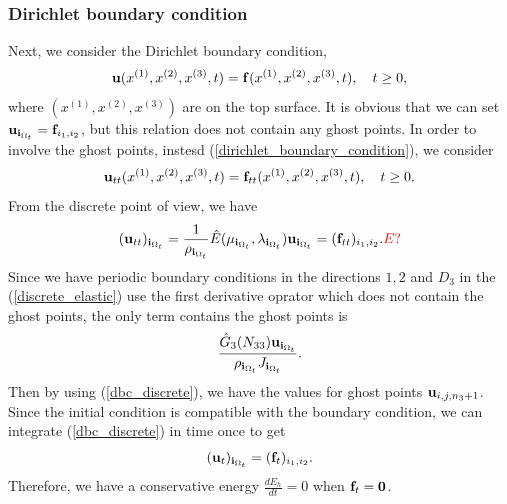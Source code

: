 \documentclass[a4paper]{article}
\begin{document}
\subsubsection{Dirichlet boundary condition}
Next, we consider the Dirichlet boundary condition, 
\begin{equation}\label{dirichlet_boundary_condition}
{\bf u}(x^{(1)},x^{(2)},x^{(3)},t) = {\bf f}(x^{(1)},x^{(2)},x^{(3)},t),  \ \ \ t \geq 0,
\end{equation}
where $(x^{(1)},x^{(2)},x^{(3)})$ are on the top surface. It is obvious that we can set ${\bf u}_{{\bf i}_{\Omega_t}} = {\bf f}_{i_1,i_2}$, but this relation does not contain any ghost points. In order to involve the ghost points, instesd (\ref{dirichlet_boundary_condition}), we consider
\begin{equation}
{\bf u}_{tt}(x^{(1)},x^{(2)},x^{(3)},t) = {\bf f}_{tt}(x^{(1)},x^{(2)},x^{(3)},t),  \ \ \ t \geq 0.
\end{equation}
From the discrete point of view, we have
\begin{equation}\label{dbc_discrete}
({\bf u}_{tt})_{{\bf i}_{\Omega_t}}=\frac{1}{\rho_{{\bf i}_{\Omega_t}}} \hat{E}(\mu_{{\bf i}_{\Omega_t}},\lambda_{{\bf i}_{\Omega_t}}){\bf u}_{{\bf i}_{\Omega_t}} = ({\bf f}_{tt})_{i_1,i_2}. {\color{red}E?}
\end{equation}
Since we have periodic boundary conditions in the directions $1,2$ and $D_3$ in the (\ref{discrete_elastic}) use the first derivative oprator which does not contain the ghost points, the only term contains the ghost points is 
\[\frac{\hat{G}_3(N_{33}){\bf u}_{{\bf i}_{\Omega_t}}}{\rho_{{\bf i}_{\Omega_t}}J_{{\bf i}_{\Omega_t}}}.\]
Then by using (\ref{dbc_discrete}), we have the values for ghost points ${\bf u}_{i,j,n_3+1}$. Since the initial condition is compatible with the boundary condition, we can integrate (\ref{dbc_discrete}) in time once to get
\[({\bf u}_t)_{{\bf i}_{\Omega_t}} = ({\bf f}_t)_{i_1,i_2}.\]
Therefore, we have a conservative energy $\frac{dE_h}{dt} = 0$ when ${\bf f}_t = {\bf 0}$.
\end{document}
